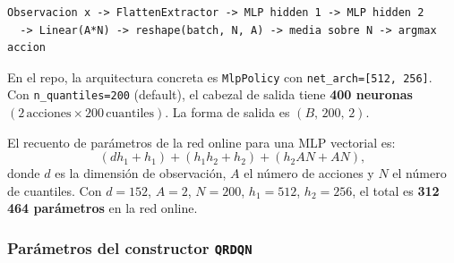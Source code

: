 ﻿\documentclass[12pt,a4paper]{article}
\begin{document}
\begin{verbatim}
Observacion x -> FlattenExtractor -> MLP hidden 1 -> MLP hidden 2
  -> Linear(A*N) -> reshape(batch, N, A) -> media sobre N -> argmax accion
\end{verbatim}

En el repo, la arquitectura concreta es \texttt{MlpPolicy} con \texttt{net\_arch=[512, 256]}. Con
\texttt{n\_quantiles=200} (default), el cabezal de salida tiene \textbf{400 neuronas}
$(2\,\text{acciones} \times 200\,\text{cuantiles})$. La forma de salida es $(B,\, 200,\, 2)$.

El recuento de parámetros de la red online para una MLP vectorial es:
\[
  (d h_1 + h_1) + (h_1 h_2 + h_2) + (h_2 A N + A N),
\]
donde \(d\) es la dimensión de observación, \(A\) el número de acciones y \(N\) el número de
cuantiles. Con \(d=152\), \(A=2\), \(N=200\), \(h_1=512\), \(h_2=256\), el total es
\textbf{312\,464 parámetros} en la red online.

\subsubsection{Parámetros del constructor \texttt{QRDQN}}
\end{document}
